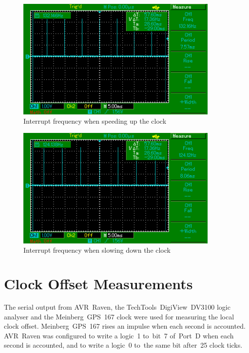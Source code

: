 \begin{figure}[H]
  \centering
  \includegraphics[width=10cm,keepaspectratio]{fig/osc-speed-up.png}
  \caption{Interrupt frequency when speeding up the clock}
  \label{fig:app-osc-speed-up}
  \bigskip
\end{figure}

\begin{figure}[H]
  \centering
  \includegraphics[width=10cm,keepaspectratio]{fig/osc-slow-down.png}
  \caption{Interrupt frequency when slowing down the clock}
  \label{fig:app-osc-slow-down}
  \bigskip
\end{figure}


\chapter{Clock Offset Measurements}\label{app:offset}
The serial output from AVR~Raven,
the TechTools~DigiView~DV3100 logic analyser and the Meinberg~GPS~167 clock
were used for measuring the local clock offset.
Meinberg~GPS~167 rises an impulse when each second is accounted.
AVR~Raven was configured to write a logic~1
to~bit~7 of~Port~D when each second is accounted,
and to write a logic~0 to~the same bit after~25 clock ticks.

